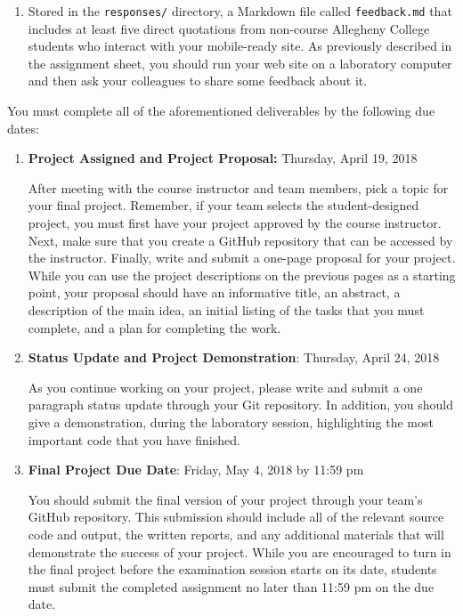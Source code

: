 \documentclass[11pt]{article}
\newcommand{\program}[1]{\lstinline{#1}}
\begin{document}
\begin{enumerate}
\item Stored in the \program{responses/} directory, a Markdown file called
  \program{feedback.md} that includes at least five direct quotations from
  non-course Allegheny College students who interact with your mobile-ready
  site. As previously described in the assignment sheet, you should run your web
  site on a laboratory computer and then ask your colleagues to share some
  feedback about it.

\end{enumerate}

\noindent
You must complete all of the aforementioned deliverables by the following due dates:

\begin{enumerate}

  \setlength{\itemsep}{0in}

  \item {\bf Project Assigned and Project Proposal:} Thursday, April 19, 2018

    After meeting with the course instructor and team members, pick a topic for
    your final project. Remember, if your team selects the student-designed
    project, you must first have your project approved by the course instructor.
    Next, make sure that you create a GitHub repository that can be accessed by
    the instructor. Finally, write and submit a one-page proposal for your
    project. While you can use the project descriptions on the previous pages as
    a starting point, your proposal should have an informative title, an
    abstract, a description of the main idea, an initial listing of the tasks
    that you must complete, and a plan for completing the work.

  \item {\bf Status Update and Project Demonstration}: Thursday, April 24, 2018

    As you continue working on your project, please write and submit a one
    paragraph status update through your Git repository. In addition, you should
    give a demonstration, during the laboratory session, highlighting the most
    important code that you have finished.

  \item {\bf Final Project Due Date}: Friday, May 4, 2018 by 11:59 pm

    You should submit the final version of your project through your team's
    GitHub repository. This submission should include all of the relevant source
    code and output, the written reports, and any additional materials that will
    demonstrate the success of your project. While you are encouraged to turn in
    the final project before the examination session starts on its date,
    students must submit the completed assignment no later than 11:59 pm on the
    due date.

\end{enumerate}
\end{document}
